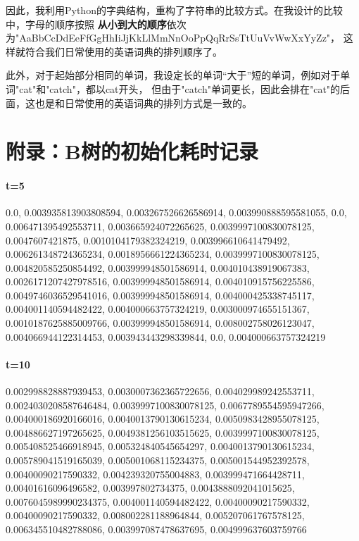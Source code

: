 \documentclass{article}
\begin{document}
因此，我利用Python的字典结构，重构了字符串的比较方式。在我设计的比较中，字母的顺序按照
\textbf{从小到大的顺序}依次为"AaBbCcDdEeFfGgHhIiJjKkLlMmNnOoPpQqRrSsTtUuVvWwXxYyZz"，
这样就符合我们日常使用的英语词典的排列顺序了。

此外，对于起始部分相同的单词，我设定长的单词“大于”短的单词，例如对于单词"cat"和"catch"，都以cat开头，
但由于"catch"单词更长，因此会排在"cat"的后面，这也是和日常使用的英语词典的排列方式是一致的。


\section{附录：B树的初始化耗时记录}

\paragraph{t=5} 
0.0, 0.003935813903808594, 0.003267526626586914, 0.003990888595581055, 0.0, 0.006471395492553711, 0.003665924072265625, 0.0039997100830078125, 0.0047607421875, 0.0010104179382324219, 0.003996610641479492, 0.006261348724365234, 0.0018956661224365234, 0.0039997100830078125, 0.004820585250854492, 0.003999948501586914, 0.004010438919067383, 0.0026171207427978516, 0.003999948501586914, 0.004010915756225586, 0.0049746036529541016, 0.003999948501586914, 0.004000425338745117, 0.004001140594482422, 0.004000663757324219, 0.003000974655151367, 0.0010187625885009766, 0.003999948501586914, 0.008002758026123047, 0.004066944122314453, 0.003943443298339844, 0.0, 0.004000663757324219

\paragraph{t=10}
0.002998828887939453, 0.0030007362365722656, 0.004029989242553711, 0.0024030208587646484, 0.0039997100830078125, 0.0067789554595947266, 0.004000186920166016, 0.0040013790130615234, 0.0050983428955078125, 0.004886627197265625, 0.0049381256103515625, 0.0039997100830078125, 0.005408525466918945, 0.005324840545654297, 0.0040013790130615234, 0.005789041519165039, 0.005001068115234375, 0.005001544952392578, 0.00400090217590332, 0.004239320755004883, 0.003999471664428711, 0.00401616096496582, 0.003997802734375, 0.0043888092041015625, 0.0076045989990234375, 0.004001140594482422, 0.00400090217590332, 0.00400090217590332, 0.008002281188964844, 0.005207061767578125, 0.006345510482788086, 0.003997087478637695, 0.004999637603759766
\end{document}
